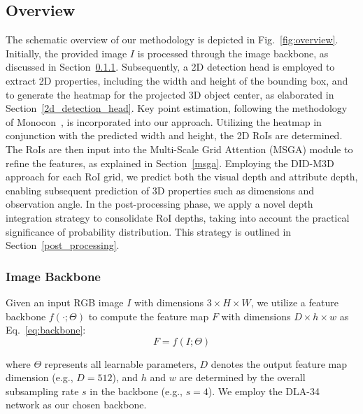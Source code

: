 \documentclass[journal]{IEEEtran}
\begin{document}
	\subsection{Overview}
	The schematic overview of our methodology is depicted in Fig.~\ref{fig:overview}. Initially, the provided image $I$ is processed through the image backbone, as discussed in Section~\ref{backbone}. Subsequently, a 2D detection head is employed to extract 2D properties, including the width and height of the bounding box, and to generate the heatmap for the projected 3D object center, as elaborated in Section~\ref{2d_detection_head}. Key point estimation, following the methodology of Monocon~\cite{monocon}, is incorporated into our approach. Utilizing the heatmap in conjunction with the predicted width and height, the 2D RoIs are determined. The RoIs are then input into the Multi-Scale Grid Attention (MSGA) module to refine the features, as explained in Section~\ref{msga}. Employing the DID-M3D~\cite{didm3d} approach for each RoI grid, we predict both the visual depth and attribute depth, enabling subsequent prediction of 3D properties such as dimensions and observation angle. In the post-processing phase, we apply a novel depth integration strategy to consolidate RoI depths, taking into account the practical significance of probability distribution. This strategy is outlined in Section~\ref{post_processing}.
	
	\subsubsection{Image Backbone}\label{backbone}
	Given an input RGB image $I$ with dimensions $3 \times H \times W$, we utilize a feature backbone $f(\cdot; \Theta)$ to compute the feature map $F$ with dimensions $D \times h \times w$ as Eq.~\eqref{eq:backbone}:
	\begin{equation}
		F = f(I;\Theta)
		\label{eq:backbone}
	\end{equation}

	where $\Theta$ represents all learnable parameters, $D$ denotes the output feature map dimension (e.g., $D=512$), and $h$ and $w$ are determined by the overall subsampling rate $s$ in the backbone (e.g., $s=4$). We employ the DLA-34~\cite{dla} network as our chosen backbone.
	
\end{document}
